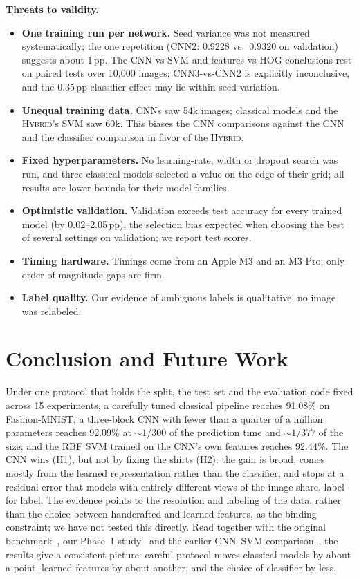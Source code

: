 \documentclass[conference]{IEEEtran}
\newcommand{\pp}{\,pp}                       %
\newcommand{\hyb}{\textsc{Hybrid}}           %
\begin{document}
\textbf{Threats to validity.}
\begin{itemize}
  \item \textbf{One training run per network.} Seed variance was not measured systematically; the one repetition
        (CNN2: 0.9228 vs.\ 0.9320 on validation) suggests about 1\pp. The CNN-vs-SVM and features-vs-HOG conclusions rest
        on paired tests over 10{,}000 images; CNN3-vs-CNN2 is explicitly inconclusive, and the 0.35\pp{} classifier effect
        may lie within seed variation.
  \item \textbf{Unequal training data.} CNNs saw 54k images; classical models and the \hyb{}'s SVM saw 60k. This biases
        the CNN comparisons against the CNN and the classifier comparison in favor of the \hyb{}.
  \item \textbf{Fixed hyperparameters.} No learning-rate, width or dropout search was run, and three classical models
        selected a value on the edge of their grid; all results are lower bounds for their model families.
  \item \textbf{Optimistic validation.} Validation exceeds test accuracy for every trained model (by 0.02--2.05\pp), the
        selection bias expected when choosing the best of several settings on validation; we report test scores.
  \item \textbf{Timing hardware.} Timings come from an Apple M3 and an M3 Pro; only order-of-magnitude gaps are firm.
  \item \textbf{Label quality.} Our evidence of ambiguous labels is qualitative; no image was relabeled.
\end{itemize}

\section{Conclusion and Future Work}
\label{sec:conclusion}
Under one protocol that holds the split, the test set and the evaluation code fixed across 15 experiments, a carefully
tuned classical pipeline reaches 91.08\% on Fashion-MNIST; a three-block CNN with fewer than a quarter of a million
parameters reaches 92.09\% at ${\sim}1/300$ of the prediction time and ${\sim}1/377$ of the size; and the RBF SVM trained on
the CNN's own features reaches 92.44\%. The CNN wins (H1), but not by fixing the shirts (H2): the gain is broad, comes
mostly from the learned representation rather than the classifier, and stops at a residual error that models
with entirely different views of the image share, label for label. The evidence points to the resolution and labeling of
the data, rather than the choice between handcrafted and learned features, as the binding constraint; we have not tested
this directly. Read together with the original benchmark~\cite{xiao2017fashion}, our Phase~1 study~\cite{phase1report}
and the earlier CNN--SVM comparison~\cite{agarap2017cnnsvm}, the results give a consistent picture: careful protocol
moves classical models by about a point, learned features by about another, and the choice of classifier by less.
\end{document}
